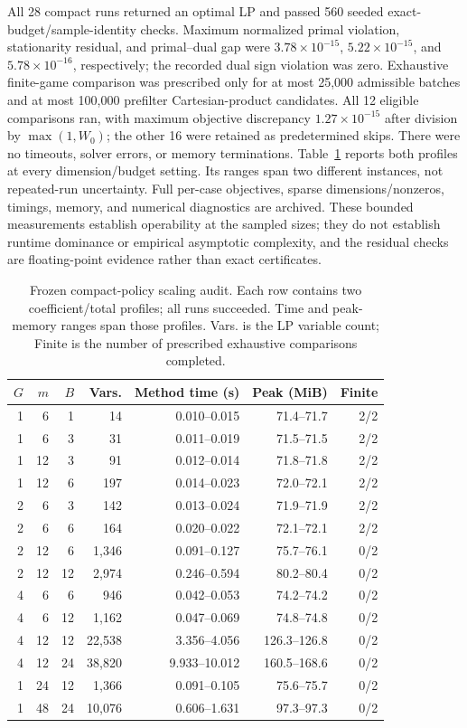 All 28 compact runs returned an optimal LP and passed 560 seeded exact-budget/sample-identity checks. Maximum normalized primal violation, stationarity residual, and primal--dual gap were $3.78\times10^{-15}$, $5.22\times10^{-15}$, and $5.78\times10^{-16}$, respectively; the recorded dual sign violation was zero. Exhaustive finite-game comparison was prescribed only for at most 25,000 admissible batches and at most 100,000 prefilter Cartesian-product candidates. All 12 eligible comparisons ran, with maximum objective discrepancy $1.27\times10^{-15}$ after division by $\max(1,W_0)$; the other 16 were retained as predetermined skips. There were no timeouts, solver errors, or memory terminations.
Table~\ref{tab:compact-scaling-audit} reports both profiles at every dimension/budget setting. Its ranges span two different instances, not repeated-run uncertainty. Full per-case objectives, sparse dimensions/nonzeros, timings, memory, and numerical diagnostics are archived. These bounded measurements establish operability at the sampled sizes; they do not establish runtime dominance or empirical asymptotic complexity, and the residual checks are floating-point evidence rather than exact certificates.
\begin{table}[htbp]
\centering\small
\caption{Frozen compact-policy scaling audit. Each row contains two coefficient/total profiles; all runs succeeded. Time and peak-memory ranges span those profiles. Vars. is the LP variable count; Finite is the number of prescribed exhaustive comparisons completed.}
\label{tab:compact-scaling-audit}
\begin{tabular}{rrrrrrr}
\hline
$G$ & $m$ & $B$ & Vars. & Method time (s) & Peak (MiB) & Finite \\
\hline
1 & 6 & 1 & 14 & 0.010--0.015 & 71.4--71.7 & 2/2 \\
1 & 6 & 3 & 31 & 0.011--0.019 & 71.5--71.5 & 2/2 \\
1 & 12 & 3 & 91 & 0.012--0.014 & 71.8--71.8 & 2/2 \\
1 & 12 & 6 & 197 & 0.014--0.023 & 72.0--72.1 & 2/2 \\
2 & 6 & 3 & 142 & 0.013--0.024 & 71.9--71.9 & 2/2 \\
2 & 6 & 6 & 164 & 0.020--0.022 & 72.1--72.1 & 2/2 \\
2 & 12 & 6 & 1,346 & 0.091--0.127 & 75.7--76.1 & 0/2 \\
2 & 12 & 12 & 2,974 & 0.246--0.594 & 80.2--80.4 & 0/2 \\
4 & 6 & 6 & 946 & 0.042--0.053 & 74.2--74.2 & 0/2 \\
4 & 6 & 12 & 1,162 & 0.047--0.069 & 74.8--74.8 & 0/2 \\
4 & 12 & 12 & 22,538 & 3.356--4.056 & 126.3--126.8 & 0/2 \\
4 & 12 & 24 & 38,820 & 9.933--10.012 & 160.5--168.6 & 0/2 \\
1 & 24 & 12 & 1,366 & 0.091--0.105 & 75.6--75.7 & 0/2 \\
1 & 48 & 24 & 10,076 & 0.606--1.631 & 97.3--97.3 & 0/2 \\
\hline
\end{tabular}
\end{table}
